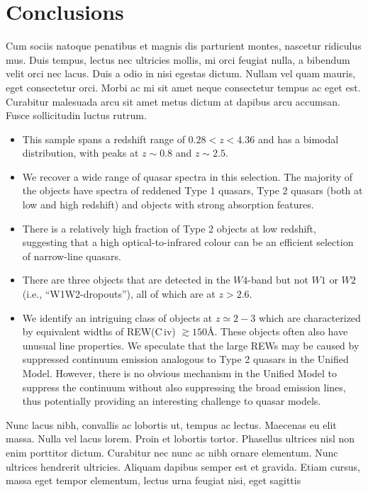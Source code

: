 \documentclass[usenatbib]{mn2e}
\begin{document}
\section{Conclusions}
\label{sec:conclusions}

Cum sociis natoque penatibus et magnis dis parturient montes, nascetur
ridiculus mus. Duis tempus, lectus nec ultricies mollis, mi orci
feugiat nulla, a bibendum velit orci nec lacus. Duis a odio in nisi
egestas dictum. Nullam vel quam mauris, eget consectetur orci. Morbi
ac mi sit amet neque consectetur tempus ac eget est. Curabitur
malesuada arcu sit amet metus dictum at dapibus arcu accumsan. Fusce
sollicitudin luctus rutrum.

\begin{itemize}
    \item{This sample spans a redshift range of $0.28 < z < 4.36$ and has a bimodal distribution, with peaks 
        at $z\sim0.8$ and $z\sim2.5$.}
   \item{We recover a wide range of quasar spectra in this selection.  
        The majority of the objects have spectra of reddened Type 1
        quasars, Type 2 quasars (both at low and high redshift) and objects
        with strong absorption features.} 
    \item{There is a relatively high fraction of Type 2 objects at low redshift,
        suggesting that a high optical-to-infrared colour can be an efficient
        selection of narrow-line quasars.}
    \item{There are three objects that are detected in the $W4$-band but
        not $W1$ or $W2$ (i.e., ``W1W2-dropouts''), all of which are at
        $z>2.6$.}
    \item{We identify an intriguing class of objects at $z\simeq 2-3$ which are
        characterized by equivalent widths of REW(C\,{\sc iv})
        $\gtrsim150$\AA.  These objects often also have unusual line
        properties.  We speculate that the large REWs may be caused by
        suppressed continuum emission analogous to Type 2 quasars in the
        Unified Model. However, there is no obvious mechanism in the Unified
        Model to suppress the continuum without also suppressing the broad
        emission lines, thus potentially providing an interesting challenge to
        quasar models.} 
\end{itemize}


Nunc lacus nibh, convallis ac lobortis ut, tempus ac lectus. Maecenas
eu elit massa. Nulla vel lacus lorem. Proin et lobortis
tortor. Phasellus ultrices nisl non enim porttitor dictum. Curabitur
nec nunc ac nibh ornare elementum. Nunc ultrices hendrerit
ultricies. Aliquam dapibus semper est et gravida. Etiam cursus, massa
eget tempor elementum, lectus urna feugiat nisi, eget sagittis
\end{document}
